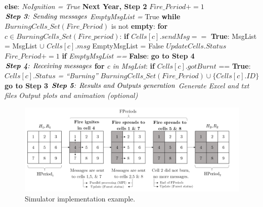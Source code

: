 \documentclass[11pt]{article}
\begin{document}
\begin{algorithm}
\begin{algorithmic}[1]
		\State \hspace{2.0cm} \textbf{else}:
			\State \hspace{3.0cm} \textit{NoIgnition = True}
			\State \hspace{3.0cm} \textbf{Next Year, Step 2}
		\State \hspace{2.0cm} $Fire\_Period+=1$
	\State $\textit{\textbf{Step 3}: Sending messages}$
	\State \hspace{1.0cm} \textit{EmptyMsgList =} True
	\State \hspace{1.0cm} \textbf{while} \textit{$BurningCells\_Set(Fire\_Period)$} is not \textbf{empty}:
		\State \hspace{2.0cm} \textbf{for} $c \in BurningCells\_Set(Fire\_period)$:
			\State \hspace{3.0cm} \textbf{if} $Cells[c].sendMsg ==$ \textbf{True}:  
				\State \hspace{4.0cm} MsgList = MsgList $\cup$ $Cells[c].msg$
				\State \hspace{4.0cm} EmptyMsgList = False
		\State \hspace{2.0cm} $Update Cells.Status$
		\State \hspace{2.0cm} $Fire\_Period+=1$
		\State \hspace{2.0cm} \textbf{if} \textit{EmptyMsgList ==} \textbf{False}:
		\State \hspace{3.0cm} \textbf{go to Step 4}
		\State $\textit{\textbf{Step 4}: Receiving messages}$
		\State \hspace{1.0cm} \textbf{for} \textit{c in MsgList}:
			\State \hspace{2.0cm} \textbf{if} $Cells[c].gotBurnt$ == \textbf{True}:
				\State \hspace{3.0cm} $Cells[c].Status$ \textit{= ``Burning''}	
				\State \hspace{3.0cm} $BurningCells\_Set(Fire\_Period) \cup \lbrace Cells[c].ID \rbrace$
			\State \hspace{2.0cm} \textbf{go to Step 3}
	\State $\textit{\textbf{Step 5}: Results and Outputs generation}$
		\State \hspace{1.0cm} \textit{Generate Excel and txt files}
		\State \hspace{1.0cm} \textit{Output plots and animation (optional)}
\EndProcedure
\end{algorithmic}
\end{algorithm}	



\begin{figure}[h!]
\centering
\includegraphics[scale=0.8]{Simulation}
\caption{\label{SImp} Simulator implementation example.} 
\end{figure}
 
\end{document}
